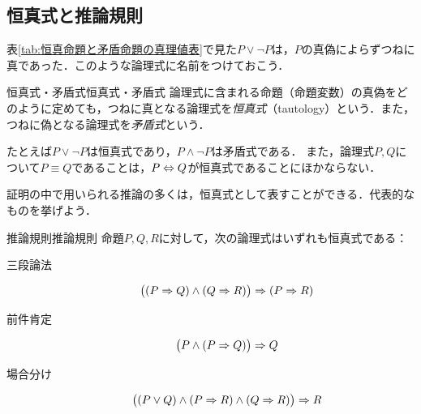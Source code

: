 \subsection{恒真式と推論規則}

表\ref{tab:恒真命題と矛盾命題の真理値表}で見た$P \lor \lnot P$は，$P$の真偽によらずつねに真であった．このような論理式に名前をつけておこう．

\begin{definition}{恒真式・矛盾式}{恒真式・矛盾式}
  論理式に含まれる命題（命題変数）の真偽をどのように定めても，つねに真となる論理式を\emph{恒真式}（tautology）という．また，つねに偽となる論理式を\emph{矛盾式}という．
\end{definition}

たとえば$P \lor \lnot P$は恒真式であり，$P \land \lnot P$は矛盾式である．
また，論理式$P,Q$について$P \equiv Q$であることは，$P \mathrel{\Leftrightarrow} Q$が恒真式であることにほかならない．

証明の中で用いられる推論の多くは，恒真式として表すことができる．代表的なものを挙げよう．

\begin{prop}{推論規則}{推論規則}
  命題$P,Q,R$に対して，次の論理式はいずれも恒真式である：
  \begin{description}
    \item[三段論法]
          \[
            \bigl( (P \mathrel{\Rightarrow} Q) \land (Q \mathrel{\Rightarrow} R) \bigr) \mathrel{\Rightarrow} (P \mathrel{\Rightarrow} R)
          \]
    \item[前件肯定]
          \[
            \bigl( P \land (P \mathrel{\Rightarrow} Q) \bigr) \mathrel{\Rightarrow} Q
          \]
    \item[場合分け]
          \[
            \bigl( (P \lor Q) \land (P \mathrel{\Rightarrow} R) \land (Q \mathrel{\Rightarrow} R) \bigr) \mathrel{\Rightarrow} R
          \]
  \end{description}
\end{prop}

